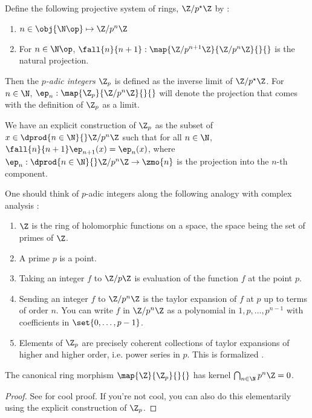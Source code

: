\begin{dfn}
  
  Define the following projective system of rings, 
  $\Z/p^\star\Z$ by : 
  \begin{enumerate}
    \item $n \in \obj{\N\op} \mapsto \Z/p^n\Z$
    \item For $n \in \N\op$, $\fall{n}{n+1} : \map{\Z/p^{n+1}\Z}{\Z/p^n\Z}{}{}$
    is the natural projection. 
  \end{enumerate}
  Then the \emph{$p$-adic integers} $\Z_p$ is defined as 
  the inverse limit of $\Z/p^\star\Z$. 
  For $n \in \N$, $\ep_n : \map{\Z_p}{\Z/p^n\Z}{}{}$ will denote the 
  projection that comes with the definition of $\Z_p$ as a limit. 

  We have an explicit construction of $\Z_p$ as 
  the subset of $x \in \dprod{n\in\N}{} \Z/p^n\Z$ such that 
  for all $n \in \N$, $\fall{n}{n+1}\ep_{n+1}(x) = \ep_n(x)$,
  where $\ep_n : \dprod{n\in\N}{} \Z/p^n\Z \to \zmo{n}$ is the projection into
  the $n$-th component. 
\end{dfn}

\begin{rmk}
  
  One should think of $p$-adic integers along the following analogy with 
  complex analysis : 
  \begin{enumerate}
    \item $\Z$ is the ring of holomorphic functions on a space,
    the space being the set of primes of $\Z$. 
    \item A prime $p$ is a point. 
    \item Taking an integer $f$ to $\Z/p\Z$ is evaluation of 
    the function $f$ at the point $p$. 
    \item Sending an integer $f$ to $\Z/p^n\Z$ is 
    the taylor expansion of $f$ at $p$
    up to terms of order $n$.
    You can write $f$ in $\Z/p^n\Z$ as a polynomial in $1,p,\dots,p^{n-1}$
    with coefficients in $\set{0,\dots,p-1}$. 
    \item Elements of $\Z_p$ are precisely 
    coherent collections of taylor expansions of higher and higher order,
    i.e. power series in $p$. 
    This is formalized .
  \end{enumerate}
\end{rmk}

\begin{prop}
  
  The canonical ring morphism $\map{\Z}{\Z_p}{}{}$ has kernel 
  $\bigcap_{n \in \N} p^n\Z = 0$.
\end{prop}
\begin{proof}
  See  for cool proof. 
  If you're not cool, you can also do this elementarily using 
  the explicit construction of $\Z_p$.
\end{proof}

